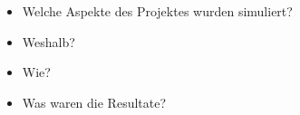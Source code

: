 \begin{itemize}
    \item
        Welche Aspekte des Projektes wurden simuliert?
    \item
        Weshalb?
    \item
        Wie?
    \item
        Was waren die Resultate?
\end{itemize}
